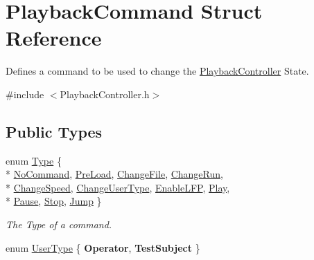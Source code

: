 \hypertarget{struct_playback_command}{\section{Playback\-Command Struct Reference}
\label{struct_playback_command}
}


Defines a command to be used to change the \hyperlink{class_playback_controller}{Playback\-Controller} State.  




{\ttfamily \#include $<$Playback\-Controller.\-h$>$}

\subsection*{Public Types}
\begin{DoxyCompactItemize}
\item 
enum \hyperlink{struct_playback_command_a6965fdf688457819423c37d4b7369b8e}{Type} \{ \\*
\hyperlink{struct_playback_command_a6965fdf688457819423c37d4b7369b8ea3c96a31ab5c13343a55fc93bc378357d}{No\-Command}, 
\hyperlink{struct_playback_command_a6965fdf688457819423c37d4b7369b8ead7b5217b11b4d97d16b05d230bb1e6d3}{Pre\-Load}, 
\hyperlink{struct_playback_command_a6965fdf688457819423c37d4b7369b8eab4504a62c808db90418532be916b9015}{Change\-File}, 
\hyperlink{struct_playback_command_a6965fdf688457819423c37d4b7369b8ead4f911e26e8aaa47633faeec70925921}{Change\-Run}, 
\\*
\hyperlink{struct_playback_command_a6965fdf688457819423c37d4b7369b8ea515eed5e72def6d10032f5355c45db7f}{Change\-Speed}, 
\hyperlink{struct_playback_command_a6965fdf688457819423c37d4b7369b8eaf57269e1d9cd5a942965e968b2da03cf}{Change\-User\-Type}, 
\hyperlink{struct_playback_command_a6965fdf688457819423c37d4b7369b8ea22f4b66f090e7344a2114fbd76378028}{Enable\-L\-F\-P}, 
\hyperlink{struct_playback_command_a6965fdf688457819423c37d4b7369b8ea1c5f471b100a7f319ff0b1d9e151221e}{Play}, 
\\*
\hyperlink{struct_playback_command_a6965fdf688457819423c37d4b7369b8ea7792e25ad3244a7e8a828e2ca1552cd3}{Pause}, 
\hyperlink{struct_playback_command_a6965fdf688457819423c37d4b7369b8ead4a4d725f7138cf97400cdf452444118}{Stop}, 
\hyperlink{struct_playback_command_a6965fdf688457819423c37d4b7369b8eaa66e81fc98e0ebf706604feb68f00c8a}{Jump}
 \}
\begin{DoxyCompactList}\small\item\em The Type of a command. \end{DoxyCompactList}\item 
enum \hyperlink{struct_playback_command_a63cad2fec38e9515df367a1575fcf6ff}{User\-Type} \{ {\bfseries Operator}, 
{\bfseries Test\-Subject}
 \}
\end{DoxyCompactItemize}
